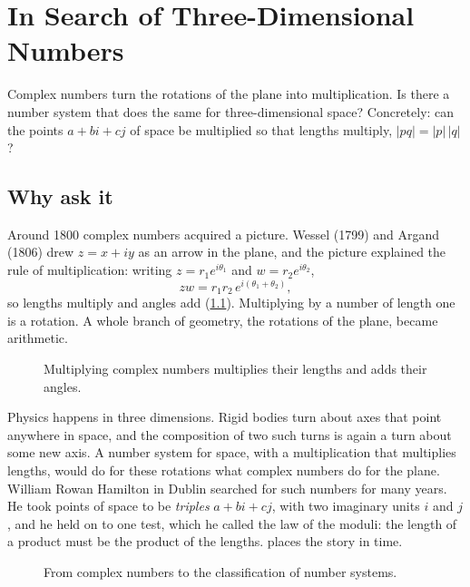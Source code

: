 \chapter{In Search of Three-Dimensional Numbers}
\label{ch:three}

\begin{question}
Complex numbers turn the rotations of the plane into multiplication. Is there a number system that does the same for three-dimensional space? Concretely: can the points $a+bi+cj$ of space be multiplied so that lengths multiply, $|pq|=|p|\,|q|$?
\end{question}

\section{Why ask it}

Around 1800 complex numbers acquired a picture. Wessel (1799) and Argand (1806) drew $z=x+iy$ as an arrow in the plane, and the picture explained the rule of multiplication: writing $z=r_1e^{i\theta_1}$ and $w=r_2e^{i\theta_2}$,
\[
  zw=r_1r_2\,e^{i(\theta_1+\theta_2)} ,
\]
so lengths multiply and angles add (\cref{fig:three-complex}). Multiplying by a number of length one is a rotation. A whole branch of geometry, the rotations of the plane, became arithmetic.

\begin{figure}[htbp]
  \centering
  \caption{Multiplying complex numbers multiplies their lengths and adds their angles.}
  \label{fig:three-complex}
\end{figure}

Physics happens in three dimensions. Rigid bodies turn about axes that point anywhere in space, and the composition of two such turns is again a turn about some new axis. A number system for space, with a multiplication that multiplies lengths, would do for these rotations what complex numbers do for the plane. William Rowan Hamilton in Dublin searched for such numbers for many years. He took points of space to be \emph{triples} $a+bi+cj$, with two imaginary units $i$ and $j$, and he held on to one test, which he called the law of the moduli: the length of a product must be the product of the lengths.  places the story in time.

\begin{figure}[htbp]
  \centering
  \caption{From complex numbers to the classification of number systems.}
  \label{fig:three-timeline}
\end{figure}

